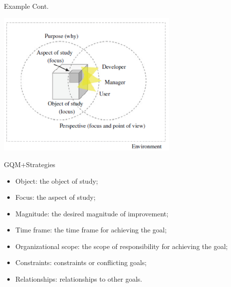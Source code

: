 \documentclass{beamer}
\begin{document}
\begin{frame}{\centerline{Example Cont.}}

\begin{center}
\includegraphics[width=90mm]{A2022.IDSEPC.SperimentazioneDeduzione/image-05.png}
\end{center}
\end{frame}

\begin{frame}{\centerline{GQM+Strategies}}

\begin{itemize}

\item  Object: the object of study;
\item  Focus: the aspect of study;
\item  Magnitude: the desired magnitude of improvement;
\item  Time frame: the time frame for achieving the goal;
\item  Organizational scope: the scope of responsibility for achieving the goal;
\item  Constraints: constraints or conflicting goals;
\item  Relationships: relationships to other goals.

\end{itemize}




\end{frame}
\end{document}
